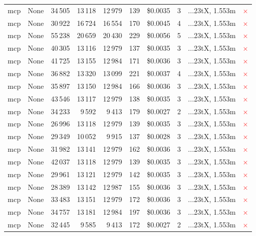 \documentclass[a4paper,11pt]{article}
\begin{document}
\begin{table}[H]
{\begin{tabular}{l r r r r r r r l c}
mcp & None & 34\,505 & 13\,118 & 12\,979 & 139 & \$0.0035 & 3 & ...23tX, 1.553m & \textcolor{red}{\(\times\)} \\
mcp & None & 30\,922 & 16\,724 & 16\,554 & 170 & \$0.0045 & 4 & ...23tX, 1.553m & \textcolor{red}{\(\times\)} \\
mcp & None & 55\,238 & 20\,659 & 20\,430 & 229 & \$0.0056 & 5 & ...23tX, 1.553m & \textcolor{red}{\(\times\)} \\
mcp & None & 40\,305 & 13\,116 & 12\,979 & 137 & \$0.0035 & 3 & ...23tX, 1.553m & \textcolor{red}{\(\times\)} \\
mcp & None & 41\,725 & 13\,155 & 12\,984 & 171 & \$0.0036 & 3 & ...23tX, 1.553m & \textcolor{red}{\(\times\)} \\
mcp & None & 36\,882 & 13\,320 & 13\,099 & 221 & \$0.0037 & 4 & ...23tX, 1.553m & \textcolor{red}{\(\times\)} \\
mcp & None & 35\,897 & 13\,150 & 12\,984 & 166 & \$0.0036 & 3 & ...23tX, 1.553m & \textcolor{red}{\(\times\)} \\
mcp & None & 43\,546 & 13\,117 & 12\,979 & 138 & \$0.0035 & 3 & ...23tX, 1.553m & \textcolor{red}{\(\times\)} \\
mcp & None & 34\,233 & 9\,592 & 9\,413 & 179 & \$0.0027 & 2 & ...23tX, 1.553m & \textcolor{red}{\(\times\)} \\
mcp & None & 26\,996 & 13\,118 & 12\,979 & 139 & \$0.0035 & 3 & ...23tX, 1.553m & \textcolor{red}{\(\times\)} \\
mcp & None & 29\,349 & 10\,052 & 9\,915 & 137 & \$0.0028 & 3 & ...23tX, 1.553m & \textcolor{red}{\(\times\)} \\
mcp & None & 31\,982 & 13\,141 & 12\,979 & 162 & \$0.0036 & 3 & ...23tX, 1.553m & \textcolor{red}{\(\times\)} \\
mcp & None & 42\,037 & 13\,118 & 12\,979 & 139 & \$0.0035 & 3 & ...23tX, 1.553m & \textcolor{red}{\(\times\)} \\
mcp & None & 29\,961 & 13\,121 & 12\,979 & 142 & \$0.0035 & 3 & ...23tX, 1.553m & \textcolor{red}{\(\times\)} \\
mcp & None & 28\,389 & 13\,142 & 12\,987 & 155 & \$0.0036 & 3 & ...23tX, 1.553m & \textcolor{red}{\(\times\)} \\
mcp & None & 33\,483 & 13\,151 & 12\,979 & 172 & \$0.0036 & 3 & ...23tX, 1.553m & \textcolor{red}{\(\times\)} \\
mcp & None & 34\,757 & 13\,181 & 12\,984 & 197 & \$0.0036 & 3 & ...23tX, 1.553m & \textcolor{red}{\(\times\)} \\
mcp & None & 32\,445 & 9\,585 & 9\,413 & 172 & \$0.0027 & 2 & ...23tX, 1.553m & \textcolor{red}{\(\times\)} \\

\end{tabular}}
\end{table}
\end{document}
